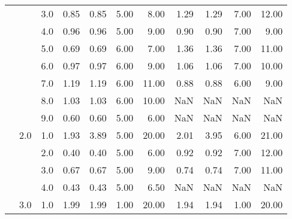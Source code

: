 \begin{tabular}{lllrrrrrrrr}
       &     & 3.0  &       0.85 &      0.85 & 5.00 &   8.00 &       1.29 &      1.29 & 7.00 &  12.00 \\
       &     & 4.0  &       0.96 &      0.96 & 5.00 &   9.00 &       0.90 &      0.90 & 7.00 &   9.00 \\
       &     & 5.0  &       0.69 &      0.69 & 6.00 &   7.00 &       1.36 &      1.36 & 7.00 &  11.00 \\
       &     & 6.0  &       0.97 &      0.97 & 6.00 &   9.00 &       1.06 &      1.06 & 7.00 &  10.00 \\
       &     & 7.0  &       1.19 &      1.19 & 6.00 &  11.00 &       0.88 &      0.88 & 6.00 &   9.00 \\
       &     & 8.0  &       1.03 &      1.03 & 6.00 &  10.00 &        NaN &       NaN &  NaN &    NaN \\
       &     & 9.0  &       0.60 &      0.60 & 5.00 &   6.00 &        NaN &       NaN &  NaN &    NaN \\
       & 2.0 & 1.0  &       1.93 &      3.89 & 5.00 &  20.00 &       2.01 &      3.95 & 6.00 &  21.00 \\
       &     & 2.0  &       0.40 &      0.40 & 5.00 &   6.00 &       0.92 &      0.92 & 7.00 &  12.00 \\
       &     & 3.0  &       0.67 &      0.67 & 5.00 &   9.00 &       0.74 &      0.74 & 7.00 &  11.00 \\
       &     & 4.0  &       0.43 &      0.43 & 5.00 &   6.50 &        NaN &       NaN &  NaN &    NaN \\
       & 3.0 & 1.0  &       1.99 &      1.99 & 1.00 &  20.00 &       1.94 &      1.94 & 1.00 &  20.00 \\
\bottomrule
\end{tabular}

